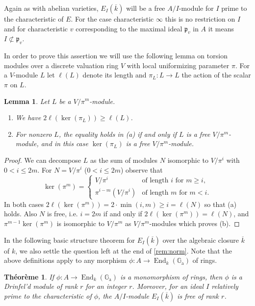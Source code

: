 \documentclass[12pt,a4paper]{article}
\theoremstyle{plain}
\newtheorem{theorem}{Th\'eor\`eme}[section]
\newtheorem{lemma}{Lemma}[section]
\theoremstyle{definition}
\theoremstyle{remark}
\DeclareMathOperator{\End}{End}
\newcommand{\fp}{\mathfrak{p}}
\newcommand{\Ga}{\mathbb{G}_\mathrm{a}}
\providecommand{\Ga}{\mathbb{G}_{\mathrm a}}
\providecommand{\End}{\operatorname{End}}
\providecommand{\fp}{\mathfrak{p}}
\begin{document}
Again as with abelian varieties, $E_I(\overline{k})$ will be a free $A/I$-module for $I$ prime to the characteristic of $E$. For the case characteristic $\infty$ this is no restriction on $I$ and for characteristic $v$ corresponding to the maximal ideal $\fp_v$ in $A$ it means $I \not\subset \fp_v$.

In order to prove this assertion we will use the following lemma on torsion modules over a discrete valuation ring $V$ with local uniformizing parameter $\pi$. For a $V$-module $L$ let $\ell(L)$ denote its length and $\pi_L: L \to L$ the action of the scalar $\pi$ on $L$.

\begin{lemma}
\label{lem:torsion}
Let $L$ be a $V/\pi^m$-module.
\begin{enumerate}[label=(\alph*)]
\item We have $2\ell(\ker(\pi_L)) \geq \ell(L)$.
\item For nonzero $L$, the equality holds in \textup{(a)} if and only if $L$ is a free $V/\pi^m$-module, and in this case $\ker(\pi_L)$ is a free $V/\pi^m$-module.
\end{enumerate}
\end{lemma}

\begin{proof}
We can decompose $L$ as the sum of modules $N$ isomorphic to $V/\pi^i$ with $0 < i \leq 2m$. For $N = V/\pi^i$ ($0 < i \leq 2m$) observe that
\[
\ker(\pi^m) = \begin{cases} V/\pi^i & \text{of length } i \text{ for } m \geq i, \\ \pi^{i-m}(V/\pi^i) & \text{of length } m \text{ for } m < i. \end{cases}
\]
In both cases $2\ell(\ker(\pi^m)) = 2 \cdot \min(i, m) \geq i = \ell(N)$ so that (a) holds. Also $N$ is free, i.e. $i = 2m$ if and only if $2\ell(\ker(\pi^m)) = \ell(N)$, and $\pi^{m-1}\ker(\pi^m)$ is isomorphic to $V/\pi^m$ as $V/\pi^m$-modules which proves (b).
\end{proof}

In the following basic structure theorem for $E_I(\overline{k})$ over the algebraic closure $\overline{k}$ of $k$, we also settle the question left at the end of \eqref{rem:norm}. Note that the above definitions apply to any morphism $\phi: A \to \End_k(\Ga)$ of rings.

\begin{theorem}
\label{thm:structure}
If $\phi: A \to \End_k(\Ga)$ is a monomorphism of rings, then $\phi$ is a Drinfel'd module of rank $r$ for an integer $r$. Moreover, for an ideal $I$ relatively prime to the characteristic of $\phi$, the $A/I$-module $E_I(\overline{k})$ is free of rank $r$.
\end{theorem}
\end{document}
